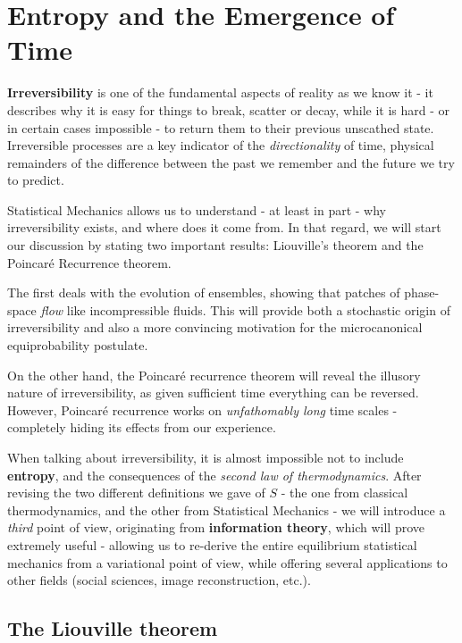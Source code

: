\documentclass[../template.tex]{subfiles}
\begin{document}
\chapter{Entropy and the Emergence of Time}
\textbf{Irreversibility} is one of the fundamental aspects of reality as we know it - it describes why it is easy for things to break, scatter or decay, while it is hard - or in certain cases impossible - to return them to their previous unscathed state. Irreversible processes are a key indicator of the \textit{directionality} of time, physical remainders of the difference between the past we remember and the future we try to predict.

\medskip

Statistical Mechanics allows us to understand - at least in part - why irreversibility exists, and where does it come from. In that regard, we will start our discussion by stating two important results: Liouville's theorem and the Poincaré Recurrence theorem. 

\medskip

The first deals with the evolution of ensembles, showing that patches of phase-space \textit{flow} like incompressible fluids. This will provide both a stochastic origin of irreversibility and also a more convincing motivation for the microcanonical equiprobability postulate.

\medskip

On the other hand, the Poincaré recurrence theorem will reveal the illusory nature of irreversibility, as given sufficient time everything can be reversed. However, Poincaré recurrence works on \textit{unfathomably long} time scales - completely hiding its effects from our experience. 

\medskip
 
When talking about irreversibility, it is almost impossible not to include \textbf{entropy}, and the consequences of the \textit{second law of thermodynamics}. After revising the two different definitions we gave of $S$ - the one from classical thermodynamics, and the other from Statistical Mechanics - we will introduce a \textit{third} point of view, originating from \textbf{information theory}, which will prove extremely useful - allowing us to re-derive the entire equilibrium statistical mechanics from a variational point of view, while offering several applications to other fields (social sciences, image reconstruction, etc.). 

\section{The Liouville theorem}
\end{document}
